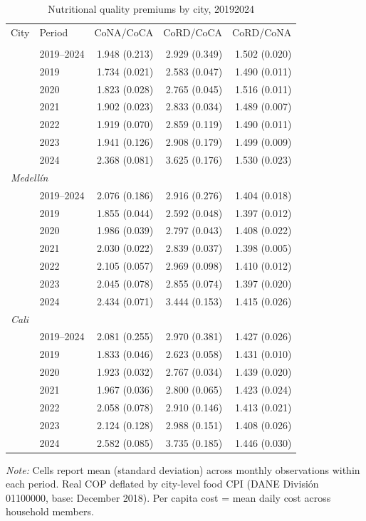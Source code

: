 \begin{table}[htbp]
\centering\small
\caption{Nutritional quality premiums by city, 2019\textendash{}2024}
\label{tab:cost_premiums}
\begin{tabular}{llrrr}
\toprule
City & Period & CoNA/CoCA & CoRD/CoCA & CoRD/CoNA \\
\addlinespace[2pt]
\midrule
\multicolumn{5}{l}{\textit{Bogotá}} \\
 & 2019–2024 & 1.948 (0.213) & 2.929 (0.349) & 1.502 (0.020) \\
 & 2019 & 1.734 (0.021) & 2.583 (0.047) & 1.490 (0.011) \\
 & 2020 & 1.823 (0.028) & 2.765 (0.045) & 1.516 (0.011) \\
 & 2021 & 1.902 (0.023) & 2.833 (0.034) & 1.489 (0.007) \\
 & 2022 & 1.919 (0.070) & 2.859 (0.119) & 1.490 (0.011) \\
 & 2023 & 1.941 (0.126) & 2.908 (0.179) & 1.499 (0.009) \\
 & 2024 & 2.368 (0.081) & 3.625 (0.176) & 1.530 (0.023) \\
\midrule
\multicolumn{5}{l}{\textit{Medellín}} \\
 & 2019–2024 & 2.076 (0.186) & 2.916 (0.276) & 1.404 (0.018) \\
 & 2019 & 1.855 (0.044) & 2.592 (0.048) & 1.397 (0.012) \\
 & 2020 & 1.986 (0.039) & 2.797 (0.043) & 1.408 (0.022) \\
 & 2021 & 2.030 (0.022) & 2.839 (0.037) & 1.398 (0.005) \\
 & 2022 & 2.105 (0.057) & 2.969 (0.098) & 1.410 (0.012) \\
 & 2023 & 2.045 (0.078) & 2.855 (0.074) & 1.397 (0.020) \\
 & 2024 & 2.434 (0.071) & 3.444 (0.153) & 1.415 (0.026) \\
\midrule
\multicolumn{5}{l}{\textit{Cali}} \\
 & 2019–2024 & 2.081 (0.255) & 2.970 (0.381) & 1.427 (0.026) \\
 & 2019 & 1.833 (0.046) & 2.623 (0.058) & 1.431 (0.010) \\
 & 2020 & 1.923 (0.032) & 2.767 (0.034) & 1.439 (0.020) \\
 & 2021 & 1.967 (0.036) & 2.800 (0.065) & 1.423 (0.024) \\
 & 2022 & 2.058 (0.078) & 2.910 (0.146) & 1.413 (0.021) \\
 & 2023 & 2.124 (0.128) & 2.988 (0.151) & 1.408 (0.026) \\
 & 2024 & 2.582 (0.085) & 3.735 (0.185) & 1.446 (0.030) \\
\bottomrule
\end{tabular}
\begin{minipage}{\linewidth}
\vspace{2pt}\footnotesize
\textit{Note:} Cells report mean (standard deviation) across monthly observations within each period. Real COP deflated by city-level food CPI (DANE Divisi\'{o}n 01100000, base: December 2018). Per capita cost = mean daily cost across household members.
\end{minipage}
\end{table}
